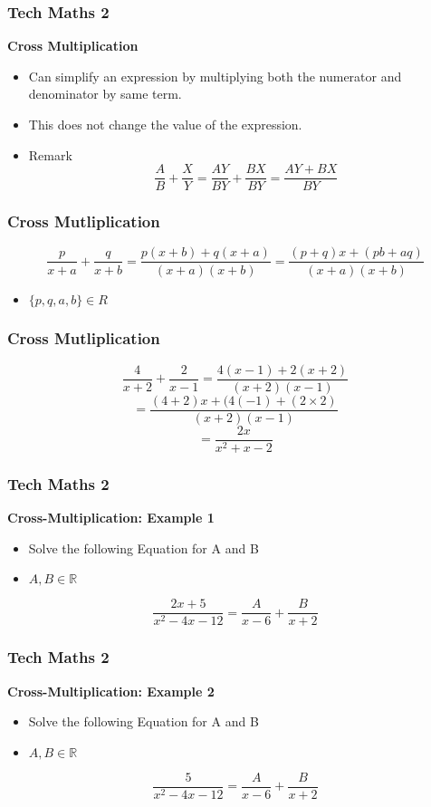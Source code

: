 	
\begin{frame}
	\frametitle{Tech Maths 2}
	\textbf{Cross Multiplication}
	\Large 
	\begin{itemize}
		\item Can simplify an expression by multiplying both the numerator and denominator by same term.
		\item This does not change the value of the expression.
		\item Remark
		{
			\LARGE
			\[ \frac{A}{B} + \frac{X}{Y} = \frac{AY}{BY} + \frac{BX}{BY} = \frac{AY+BX}{BY}\]
		}
	\end{itemize}
\end{frame}


\begin{frame}
	\frametitle{Cross Mutliplication}
	\Large
	\[  \frac{p}{x+a} + \frac{q}{x+b}   = \frac{p(x+b) + q(x+a)}{(x+a)(x+b)} = \frac{(p+q)x+ (pb+aq)}{(x+a)(x+b)} \]
	
	\begin{itemize}
		\item $\{p,q,a,b\} \in R$
	\end{itemize}
	
\end{frame}
\begin{frame}
	\frametitle{Cross Mutliplication}
	\Large
	\[  \frac{4}{x+2} + \frac{2}{x-1}   = \frac{4(x-1) + 2(x+2)}{(x+2)(x-1)} \]
	\[ = \frac{(4+2)x + (4(-1)+(2\times 2)}{(x+2)(x-1)} \]
	\[ = \frac{2x}{x^2+x-2}\]
	
\end{frame}
\begin{frame}
	\frametitle{Tech Maths 2}
	\textbf{Cross-Multiplication: Example 1}
	\begin{itemize}
		\item Solve the following Equation for A and B
		\item $A,B \in \mathbb{R}$
	\end{itemize}
	
	\[ \frac{2x + 5}{x^2 - 4x - 12} = \frac{A}{x-6} + \frac{B}{x+2}\]
\end{frame}
\begin{frame}
	\frametitle{Tech Maths 2}
	\textbf{Cross-Multiplication: Example 2}
	\begin{itemize}
		\item Solve the following Equation for A and B
		\item $A,B \in \mathbb{R}$
	\end{itemize}
	
	\[ \frac{5}{x^2 - 4x - 12} = \frac{A}{x-6} + \frac{B}{x+2}\]
\end{frame}




